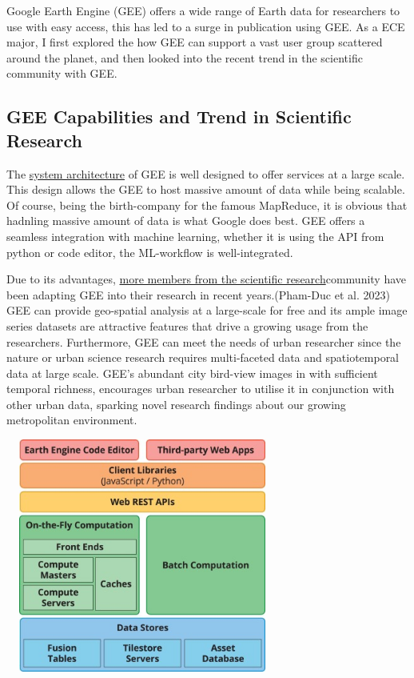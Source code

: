 \documentclass[
  letterpaper,
  DIV=11,
  numbers=noendperiod]{scrreprt}
\begin{document}

Google Earth Engine (GEE) offers a wide range of Earth data for
researchers to use with easy access, this has led to a surge in
publication using GEE. As a ECE major, I first explored the how GEE can
support a vast user group scattered around the planet, and then looked
into the recent trend in the scientific community with GEE.

\hypertarget{gee-capabilities-and-trend-in-scientific-research}{%
\subsection*{GEE Capabilities and Trend in Scientific
Research}\label{gee-capabilities-and-trend-in-scientific-research}}

The
\href{https://www.sciencedirect.com/science/article/pii/S0034425717302900?via\%3Dihub}{system
architecture} of GEE is well designed to offer services at a large
scale. This design allows the GEE to host massive amount of data while
being scalable. Of course, being the birth-company for the famous
MapReduce, it is obvious that hadnling massive amount of data is what
Google does best. GEE offers a seamless integration with machine
learning, whether it is using the API from python or code editor, the
ML-workflow is well-integrated.

Due to its advantages,
\href{https://link.springer.com/article/10.1007/s12145-023-01035-2\#Fig6}{more
members from the scientific research}community have been adapting GEE
into their research in recent years.(Pham-Duc et al. 2023) GEE can
provide geo-spatial analysis at a large-scale for free and its ample
image series datasets are attractive features that drive a growing usage
from the researchers. Furthermore, GEE can meet the needs of urban
researcher since the nature or urban science research requires
multi-faceted data and spatiotemporal data at large scale. GEE's
abundant city bird-view images in with sufficient temporal richness,
encourages urban researcher to utilise it in conjunction with other
urban data, sparking novel research findings about our growing
metropolitan environment.

\includegraphics[width=3.54167in,height=3.02083in]{images/wk6/1-s2.0-S0034425717302900-gr2.jpg}
\end{document}
